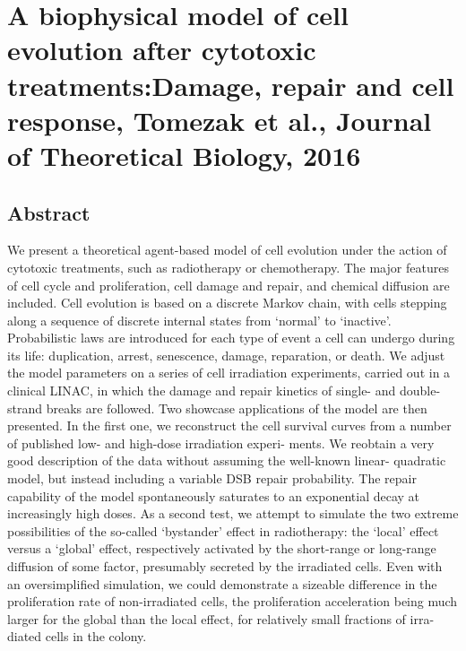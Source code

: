 \documentclass[11pt,a4paper]{article}
\begin{document}
\section*{A biophysical model of cell evolution after cytotoxic treatments:Damage, repair and cell response, Tomezak et al., Journal of Theoretical Biology, 2016}
\subsection*{Abstract}
We present a theoretical agent-based model of cell evolution under the action of cytotoxic treatments,
such as radiotherapy or chemotherapy. The major features of cell cycle and proliferation, cell damage and
repair, and chemical diffusion are included. Cell evolution is based on a discrete Markov chain, with cells
stepping along a sequence of discrete internal states from ‘normal’ to ‘inactive’. Probabilistic laws are
introduced for each type of event a cell can undergo during its life: duplication, arrest, senescence,
damage, reparation, or death. We adjust the model parameters on a series of cell irradiation experiments,
carried out in a clinical LINAC, in which the damage and repair kinetics of single- and double-strand
breaks are followed. Two showcase applications of the model are then presented. In the first one, we
reconstruct the cell survival curves from a number of published low- and high-dose irradiation experi-
ments. We reobtain a very good description of the data without assuming the well-known linear-
quadratic model, but instead including a variable DSB repair probability. The repair capability of the
model spontaneously saturates to an exponential decay at increasingly high doses. As a second test, we
attempt to simulate the two extreme possibilities of the so-called ‘bystander’ effect in radiotherapy: the
‘local’ effect versus a ‘global’ effect, respectively activated by the short-range or long-range diffusion of
some factor, presumably secreted by the irradiated cells. Even with an oversimplified simulation, we
could demonstrate a sizeable difference in the proliferation rate of non-irradiated cells, the proliferation
acceleration being much larger for the global than the local effect, for relatively small fractions of irra-
diated cells in the colony.
\end{document}
